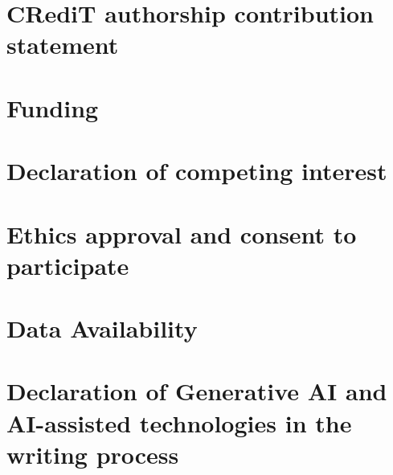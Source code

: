 \documentclass[preprint,review,a4paper]{elsarticle}
\begin{document}









\section*{CRediT authorship contribution statement}


\section*{Funding}


\section*{Declaration of competing interest}


\section*{Ethics approval and consent to participate}


\section*{Data Availability}


\section*{Declaration of Generative AI and AI-assisted technologies in the writing process}




\end{document}
